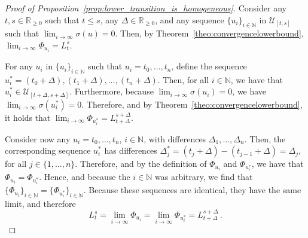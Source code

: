 \documentclass[10pt]{paper}
\theoremstyle{definition}
\newcommand{\nats}{\mathbb{N}}
\newcommand{\reals}{\mathbb{R}}
\newcommand{\realsnonneg}{\reals_{\geq 0}}
\begin{document}
\begin{proof}[Proof of Proposition~\ref{prop:lower_transition_is_homogeneous}]
Consider any $t,s\in\realsnonneg$ such that $t\leq s$, any $\Delta\in\realsnonneg$, and any sequence $\{u_i\}_{i\in\nats}$ in $\mathcal{U}_{[t,s]}$ such that $\lim_{i\to\infty}\sigma(u)=0$. Then, by Theorem~\ref{theo:convergencelowerbound}, $\lim_{i\to\infty}\Phi_{u_i}=L_t^s$.

For any $u_i$ in $\{u_i\}_{i\in\nats}$ such that $u_i=t_0,\ldots,t_n$, define the sequence $u_i^*=(t_0+\Delta),(t_1+\Delta),\ldots,(t_n+\Delta)$. Then, for all $i\in\nats$, we have that $u_i^*\in\mathcal{U}_{[t+\Delta,s+\Delta]}$. Furthermore, because $\lim_{i\to\infty}\sigma(u_i)=0$, we have $\lim_{i\to\infty}\sigma(u_i^*)=0$. Therefore, and by Theorem~\ref{theo:convergencelowerbound},  it holds that $\lim_{i\to\infty}\Phi_{u_i^*}=L_{t+\Delta}^{s+\Delta}$.

Consider now any $u_i=t_0,\ldots,t_n$, $i\in\nats$, with differences $\Delta_1,\ldots,\Delta_n$. Then, the corresponding sequence $u_i^*$ has differences $\Delta^*_j=(t_j+\Delta)-(t_{j-1}+\Delta)=\Delta_j$, for all $j\in\{1,\ldots,n\}$. Therefore, and by the definition of $\Phi_{u_i}$ and $\Phi_{u_i^*}$, we have that $\Phi_{u_i}=\Phi_{u_i^*}$. Hence, and because the $i\in\nats$ was arbitrary, we find that $\{\Phi_{u_i}\}_{i\in\nats}=\{\Phi_{u_i^*}\}_{i\in\nats}$. Because these sequences are identical, they have the same limit, and therefore
\begin{equation*}
L_t^s=\lim_{i\to\infty}\Phi_{u_i}=\lim_{i\to\infty}\Phi_{u_i^*}=L_{t+\Delta}^{s+\Delta}\,.
\end{equation*}
\end{proof}
\end{document}
